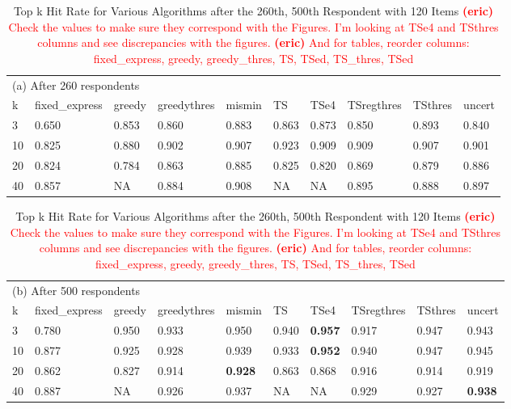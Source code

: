 \documentclass[nonblindrev]{informs3}
\newcommand{\eric}[1]{\textcolor{red}{\textbf{(eric)} #1}}
\begin{document}
\begin{table}
\caption{Top k Hit Rate for Various Algorithms after the {260th, 500th} Respondent with 120 Items \eric{Check the values to make sure they correspond with the Figures. I'm looking at TSe4 and TSthres columns and see discrepancies with the figures.} \eric{And for tables, reorder columns: fixed\_express, greedy, greedy\_thres, TS, TSed, TS\_thres, TSed}
 }
\label{table:at_260_500}
\begin{center}
\begin{tabular}{llllllllll}
\hline 
\hline
\multicolumn{10}{l}{(a) After 260 respondents}\\
k &  fixed\_express &  greedy &  greedythres &  mismin &    TS &  TSe4 &  TSregthres &  TSthres &  uncert \\ \hline
  3 &          0.650 &   0.853 &        0.860 &   0.883 & 0.863 & 0.873 &       0.850 &    0.893 &   0.840 \\
  10 &          0.825 &   0.880 &        0.902 &   0.907 & 0.923 & 0.909 &       0.909 &    0.907 &   0.901 \\
  20 &          0.824 &   0.784 &        0.863 &   0.885 & 0.825 & 0.820 &       0.869 &    0.879 &   0.886 \\  
  40 &          0.857 &   NA &        0.884 &   0.908 & NA & NA &       0.895 &    0.888 &   0.897 \\
\hline
\hline
\end{tabular}
\begin{tabular}{llllllllll}
\multicolumn{10}{l}{(b) After 500 respondents}\\
k &  fixed\_express &  greedy &  greedythres &  mismin &    TS &  TSe4 &  TSregthres &  TSthres &  uncert \\
\hline
   3 &          0.780 &   0.950 &        0.933 &   0.950 & 0.940 & \textbf{0.957} &       0.917 &    0.947 &   0.943 \\
  10 &          0.877 &   0.925 &        0.928 &   0.939 & 0.933 & \textbf{0.952} &       0.940 &    0.947 &   0.945 \\  
  20 &          0.862 &   0.827 &        0.914 &   \textbf{0.928} & 0.863 & 0.868 &       0.916 &    0.914 &   0.919 \\  
  40 &          0.887 &   NA &        0.926 &   0.937 & NA & NA &       0.929 &    0.927 &   \textbf{0.938} \\
\hline 
\hline
\end{tabular}
\end{center}
\end{table}
\end{document}
